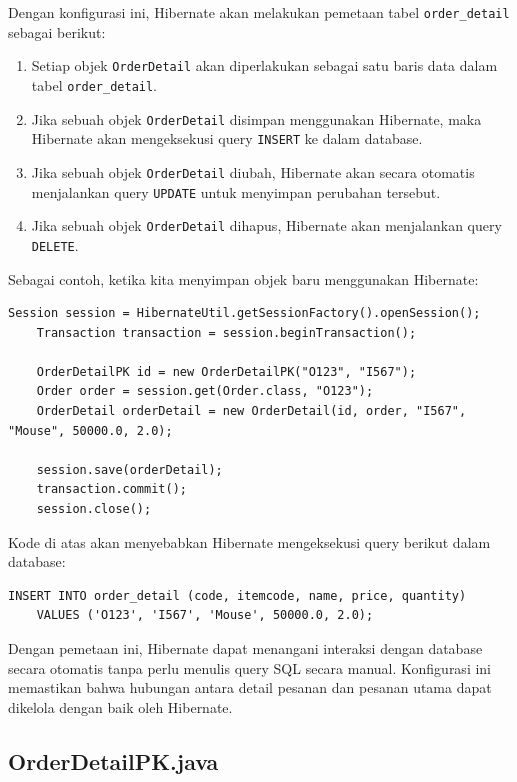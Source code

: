 Dengan konfigurasi ini, Hibernate akan melakukan pemetaan tabel \texttt{order\_detail} sebagai berikut:
\begin{enumerate}
	\item Setiap objek \texttt{OrderDetail} akan diperlakukan sebagai satu baris data dalam tabel \texttt{order\_detail}.
	\item Jika sebuah objek \texttt{OrderDetail} disimpan menggunakan Hibernate, maka Hibernate akan mengeksekusi query \texttt{INSERT} ke dalam database.
	\item Jika sebuah objek \texttt{OrderDetail} diubah, Hibernate akan secara otomatis menjalankan query \texttt{UPDATE} untuk menyimpan perubahan tersebut.
	\item Jika sebuah objek \texttt{OrderDetail} dihapus, Hibernate akan menjalankan query \texttt{DELETE}.
\end{enumerate}

Sebagai contoh, ketika kita menyimpan objek baru menggunakan Hibernate:

\begin{lstlisting}[style=JavaStyle]
	Session session = HibernateUtil.getSessionFactory().openSession();
	Transaction transaction = session.beginTransaction();
	
	OrderDetailPK id = new OrderDetailPK("O123", "I567");
	Order order = session.get(Order.class, "O123");
	OrderDetail orderDetail = new OrderDetail(id, order, "I567", "Mouse", 50000.0, 2.0);
	
	session.save(orderDetail);
	transaction.commit();
	session.close();
\end{lstlisting}

Kode di atas akan menyebabkan Hibernate mengeksekusi query berikut dalam database:

\begin{lstlisting}[style=sql]
	INSERT INTO order_detail (code, itemcode, name, price, quantity) 
	VALUES ('O123', 'I567', 'Mouse', 50000.0, 2.0);
\end{lstlisting}

Dengan pemetaan ini, Hibernate dapat menangani interaksi dengan database secara otomatis tanpa perlu menulis query SQL secara manual. Konfigurasi ini memastikan bahwa hubungan antara detail pesanan dan pesanan utama dapat dikelola dengan baik oleh Hibernate.


\subsection{OrderDetailPK.java}

